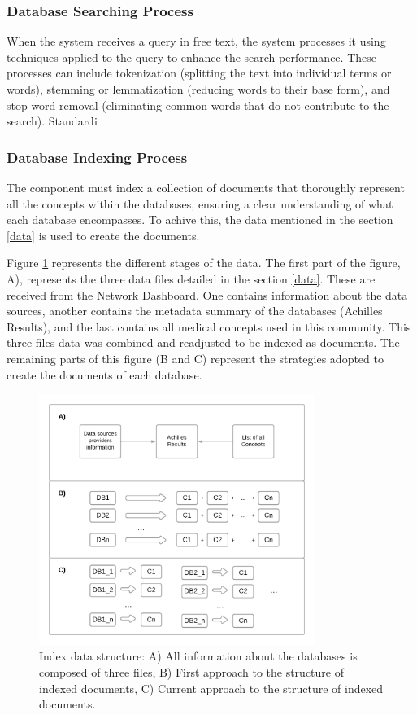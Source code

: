 \subsubsection{Database Searching Process}
\label{searchprocess}

When the {\ir} system receives a query in free text, the system processes it using {\nlp} techniques applied to the query to enhance the search performance. These processes can include tokenization (splitting the text into individual terms or words), stemming or lemmatization (reducing words to their base form), and stop-word removal (eliminating common words that do not contribute to the search). Standardi\subsubsection{Database Indexing Process}

The {\ir} component must index a collection of documents that thoroughly represent all the concepts within the databases, ensuring a clear understanding of what each database encompasses. To achive this, the data mentioned in the section \ref{data} is used to create the documents.

Figure \ref{fig_struct} represents the different stages of the data. The first part of the figure, A), represents the three data files detailed in the section \ref{data}. These are received from the {\ehden} Network Dashboard. One contains information about the data sources, another contains the metadata summary of the databases (Achilles Results), and the last contains all medical concepts used in this community. This three files data was combined and readjusted to be indexed as documents. The remaining parts of this figure (B and C) represent the strategies adopted to create the documents of each database.

\begin{figure}[H]
    \includegraphics[width=0.8\textwidth]{figs/chapter3/index_struct.png}
    \centering
    \caption{Index data structure: A) All information about the databases is composed of three files, B) First approach to the structure of indexed documents, C) Current approach to the structure of indexed documents.}
    \label{fig_struct}
\end{figure}


